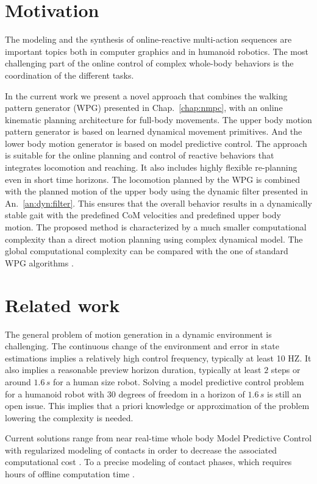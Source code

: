 \section{Motivation}
\label{intro}

The modeling and the synthesis of online-reactive multi-action sequences
are important topics both in computer graphics and in humanoid robotics.
The most challenging part of the online control of complex whole-body behaviors is the coordination of the different tasks.

In the current work we present a novel approach that combines the walking pattern generator (WPG) presented in Chap.~\ref{chap:nmpc},
with an online kinematic planning architecture for full-body movements.
The upper body motion pattern generator is based on learned dynamical movement primitives.
And the lower body motion generator is based on model predictive control.
The approach is suitable for the online planning and control of reactive behaviors that integrates locomotion and reaching.
It also includes highly flexible re-planning even in short time horizons.
The locomotion planned by the WPG is combined with the planned motion of the upper body using the dynamic filter presented in An.~\ref{an:dyn:filter}.
This ensures that the overall behavior results in a dynamically stable gait with the predefined CoM velocities and predefined upper body motion.
The proposed method is characterized by a much smaller computational complexity than a direct motion planning using complex dynamical model.
The global computational complexity can be compared with the one of standard WPG algorithms \cite{herdt:ar:2010}.

\section{Related work}
\label{relatedworks}

The general problem of motion generation in a dynamic environment is challenging.
The continuous change of the environment and error in state estimations implies a relatively high control frequency, typically at least 10 HZ.
It also implies a reasonable preview horizon duration, typically at least $2$ steps or around $1.6\,s$ for a human size robot.
Solving a model predictive control problem for a humanoid robot with $30$ degrees of freedom in a horizon of $1.6\,s$ is still an open issue.
This implies that a priori knowledge or approximation of the problem lowering the complexity is needed.

Current solutions range from near real-time whole body Model Predictive Control with
regularized modeling of contacts in order to decrease the associated computational cost
\cite{tassa:iros:2012,Koenemann:iros:2015}.
To a precise modeling of contact phases, which requires hours of offline computation time \cite{ref:km12}.

